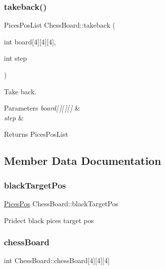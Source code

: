 \subsubsection{\texorpdfstring{takeback()}{takeback()}}
{\footnotesize\ttfamily Pices\+Pos\+List Chess\+Board\+::takeback (\begin{DoxyParamCaption}\item[{int}]{board\mbox{[}4\mbox{]}\mbox{[}4\mbox{]}\mbox{[}4\mbox{]},  }\item[{int}]{step }\end{DoxyParamCaption})}



Take back. 


\begin{DoxyParams}{Parameters}
{\em board\mbox{[}$\,$\mbox{]}\mbox{[}$\,$\mbox{]}\mbox{[}$\,$\mbox{]}} & \\
\hline
{\em step} & \\
\hline
\end{DoxyParams}
\begin{DoxyReturn}{Returns}
Pices\+Pos\+List 
\end{DoxyReturn}


\subsection{Member Data Documentation}
\mbox{\label{class_chess_board_a5d8e4b1cbd87ef1dd7bac6de42e375ff}} 
\subsubsection{\texorpdfstring{black\+Target\+Pos}{blackTargetPos}}
{\footnotesize\ttfamily \hyperlink{struct_pices_pos}{Pices\+Pos} Chess\+Board\+::black\+Target\+Pos}

Pridect black pices target pos \mbox{\label{class_chess_board_ab58be444056dbb531b3b2535b4054b54}} 
\subsubsection{\texorpdfstring{chess\+Board}{chessBoard}}
{\footnotesize\ttfamily int Chess\+Board\+::chess\+Board\mbox{[}4\mbox{]}\mbox{[}4\mbox{]}\mbox{[}4\mbox{]}}

